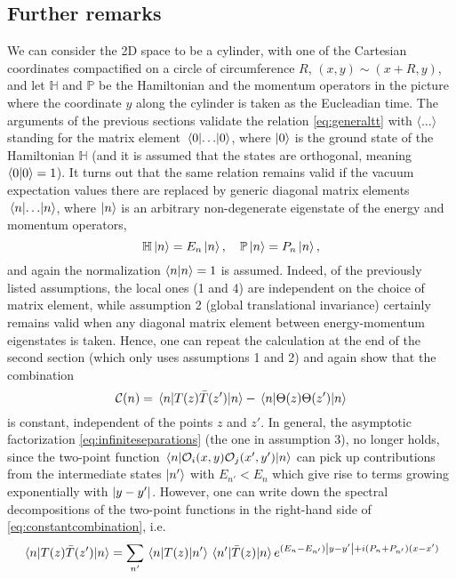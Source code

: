\subsection{Further remarks}
We can consider the 2D space to be a cylinder, with one of the  Cartesian
coordinates compactified on a circle of circumference $R$, $(x,y) \sim
(x+R,y)$, and let $\mathbb{H}$ and $\mathbb{P}$ be the Hamiltonian and the
momentum operators in the picture where the  coordinate $y$ along the cylinder
is  taken as the Eucleadian time. The arguments of the previous sections
validate the relation \eqref{eq:generaltt} with $\langle\dots\rangle$ standing
for the matrix element $\mel{0}{\dots}{0}$, where $\ket{0}$ is the ground state
of the Hamiltonian $\mathbb{H}$ (and it is assumed that the states are
orthogonal, meaning $\braket{0}{0}= 1$). It turns out that the same relation
remains valid if the vacuum expectation values there are replaced by generic
diagonal matrix elements $\mel{n}{\dots}{n}$, where $\ket{n}$ is an arbitrary
non-degenerate eigenstate of the energy and momentum operators,
\begin{equation}
  \mathbb{H}\ket{n} = E_n\ket{n}, \quad \mathbb{P}\ket{n} = P_n\ket{n},
\end{equation}
and again the normalization $\braket{n}{n}=1$ is assumed. Indeed, of the
previously listed assumptions, the local ones (1 and 4) are independent on the 
choice of matrix element, while assumption 2 (global translational invariance)
certainly remains valid when any diagonal matrix element between
energy-momentum eigenstates is taken. Hence, one can repeat the calculation at
the end of the second section (which only uses assumptions 1 and 2) and again
show that the combination
\begin{equation}
  \mathcal{C}(n) = \mel{n}{T(z)\bar{T}(z')}{n}
  - \mel{n}{\Theta(z)\Theta(z')}{n}
  \label{eq:constantcombination}
\end{equation}
is constant, independent of the points $z$ and $z'$. In general, the asymptotic
factorization \eqref{eq:infiniteseparations} (the one in assumption 3), no
longer holds, since the two-point function $\mel{n}{\mathcal{O}_i (x,y) \mathcal{O}_j
  (x',y')}{n}$ can pick up contributions from the  intermediate states
  $\ket{n'}$ with $E_{n'} < E_n$ which give rise to terms growing exponentially
  with $\abs{y-y'}$. However, one can write down the spectral decompositions of
  the two-point functions in the right-hand side of
  \eqref{eq:constantcombination}, i.e.
\begin{equation}
  \mel{n}{T(z)\bar{T}(z')}{n}
  = \sum_{n'}\mel{n}{T(z)}{n'}\mel{n'}{\bar{T}(z)}{n}e^{(E_n-E_{n'})\abs{y-y'}+i(P_n
    + P_{n'})(x-x')}
\end{equation}
